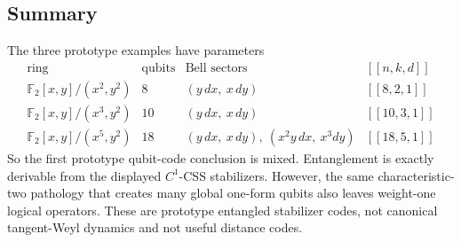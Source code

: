 \subsection{Summary}
The three prototype examples have parameters
\[
\begin{array}{c|c|c|c}
\text{ring} & \text{qubits} & \text{Bell sectors} & [[n,k,d]]\\ \hline
\mathbb F_2[x,y]/(x^2,y^2) & 8 & (y\,dx,\ x\,dy) & [[8,2,1]]\\
\mathbb F_2[x,y]/(x^3,y^2) & 10 & (y\,dx,\ x\,dy) & [[10,3,1]]\\
\mathbb F_2[x,y]/(x^5,y^2) & 18 &
  (y\,dx,\ x\,dy),\ (x^2y\,dx,\ x^3dy) & [[18,5,1]]
\end{array}
\]
So the first prototype qubit-code conclusion is mixed.  Entanglement is exactly
derivable from the displayed \(C^1\)-CSS stabilizers.  However, the same
characteristic-two pathology that creates many global one-form qubits also
leaves weight-one logical operators.  These are prototype entangled stabilizer
codes, not canonical tangent-Weyl dynamics and not useful distance codes.
